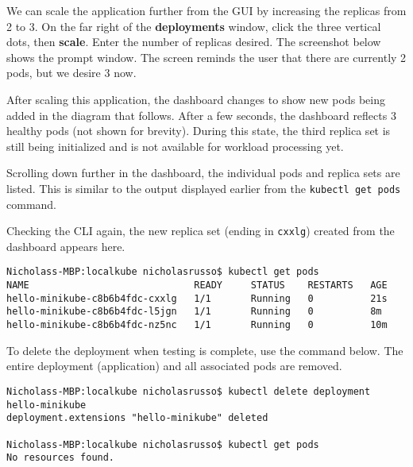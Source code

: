 
We can scale the application further from the GUI by increasing the replicas
from 2 to 3. On the far right of the \textbf{deployments} window, click the
three vertical dots, then \textbf{scale}. Enter the number of replicas
desired. The screenshot below shows the prompt window. The screen reminds the
user that there are currently 2 pods, but we desire 3 now.


After scaling this application, the dashboard changes to show new pods being
added in the diagram that follows. After a few seconds, the dashboard reflects 3
healthy pods (not shown for brevity). During this state, the third replica set
is still being initialized and is not available for workload processing yet.



Scrolling down further in the dashboard, the individual pods and replica sets
are listed. This is similar to the output displayed earlier from the
\verb|kubectl get pods| command.


Checking the CLI again, the new replica set (ending in \verb|cxxlg|) created
from the dashboard appears here.

\begin{verbatim}
Nicholass-MBP:localkube nicholasrusso$ kubectl get pods
NAME                             READY     STATUS    RESTARTS   AGE
hello-minikube-c8b6b4fdc-cxxlg   1/1       Running   0          21s
hello-minikube-c8b6b4fdc-l5jgn   1/1       Running   0          8m
hello-minikube-c8b6b4fdc-nz5nc   1/1       Running   0          10m
\end{verbatim}

To delete the deployment when testing is complete, use the command below. The
entire deployment (application) and all associated pods are removed.

\begin{verbatim}
Nicholass-MBP:localkube nicholasrusso$ kubectl delete deployment hello-minikube
deployment.extensions "hello-minikube" deleted

Nicholass-MBP:localkube nicholasrusso$ kubectl get pods
No resources found.
\end{verbatim}

